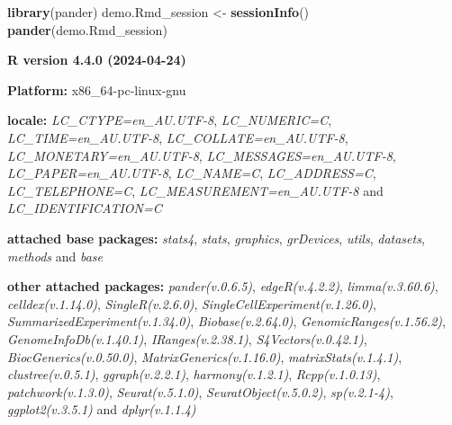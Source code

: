 \documentclass[
]{book}
\newenvironment{Shaded}{\begin{snugshade}}{\end{snugshade}}
\newcommand{\FunctionTok}[1]{\textcolor[rgb]{0.13,0.29,0.53}{\textbf{#1}}}
\newcommand{\NormalTok}[1]{#1}
\newcommand{\OtherTok}[1]{\textcolor[rgb]{0.56,0.35,0.01}{#1}}
\begin{document}
\begin{Shaded}
\begin{Highlighting}[]

\FunctionTok{library}\NormalTok{(pander)}
\NormalTok{demo.Rmd\_session }\OtherTok{\textless{}{-}} \FunctionTok{sessionInfo}\NormalTok{()}
\FunctionTok{pander}\NormalTok{(demo.Rmd\_session)}
\end{Highlighting}
\end{Shaded}

\textbf{R version 4.4.0 (2024-04-24)}

\textbf{Platform:} x86\_64-pc-linux-gnu

\textbf{locale:}
\emph{LC\_CTYPE=en\_AU.UTF-8}, \emph{LC\_NUMERIC=C}, \emph{LC\_TIME=en\_AU.UTF-8}, \emph{LC\_COLLATE=en\_AU.UTF-8}, \emph{LC\_MONETARY=en\_AU.UTF-8}, \emph{LC\_MESSAGES=en\_AU.UTF-8}, \emph{LC\_PAPER=en\_AU.UTF-8}, \emph{LC\_NAME=C}, \emph{LC\_ADDRESS=C}, \emph{LC\_TELEPHONE=C}, \emph{LC\_MEASUREMENT=en\_AU.UTF-8} and \emph{LC\_IDENTIFICATION=C}

\textbf{attached base packages:}
\emph{stats4}, \emph{stats}, \emph{graphics}, \emph{grDevices}, \emph{utils}, \emph{datasets}, \emph{methods} and \emph{base}

\textbf{other attached packages:}
\emph{pander(v.0.6.5)}, \emph{edgeR(v.4.2.2)}, \emph{limma(v.3.60.6)}, \emph{celldex(v.1.14.0)}, \emph{SingleR(v.2.6.0)}, \emph{SingleCellExperiment(v.1.26.0)}, \emph{SummarizedExperiment(v.1.34.0)}, \emph{Biobase(v.2.64.0)}, \emph{GenomicRanges(v.1.56.2)}, \emph{GenomeInfoDb(v.1.40.1)}, \emph{IRanges(v.2.38.1)}, \emph{S4Vectors(v.0.42.1)}, \emph{BiocGenerics(v.0.50.0)}, \emph{MatrixGenerics(v.1.16.0)}, \emph{matrixStats(v.1.4.1)}, \emph{clustree(v.0.5.1)}, \emph{ggraph(v.2.2.1)}, \emph{harmony(v.1.2.1)}, \emph{Rcpp(v.1.0.13)}, \emph{patchwork(v.1.3.0)}, \emph{Seurat(v.5.1.0)}, \emph{SeuratObject(v.5.0.2)}, \emph{sp(v.2.1-4)}, \emph{ggplot2(v.3.5.1)} and \emph{dplyr(v.1.1.4)}
\end{document}
